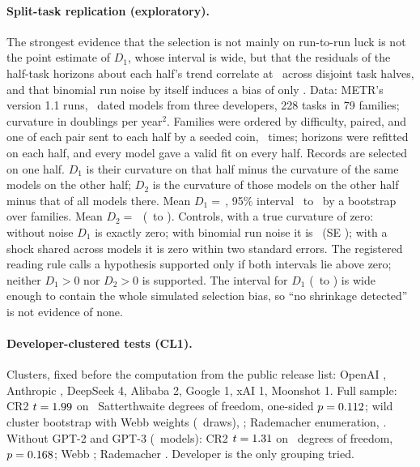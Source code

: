 \documentclass[aps,pre,twocolumn,superscriptaddress,nofootinbib,9pt]{revtex4-2}
\begin{document}
\paragraph*{Split-task replication (exploratory).} The strongest evidence that the selection is not mainly on run-to-run luck is not the point estimate of $D_1$, whose interval is wide, but that the residuals of the half-task horizons about each half's trend correlate at \stR\ across disjoint task halves, and that binomial run noise by itself induces a bias of only \stCone. Data: METR's version 1.1 runs, \stModels\ dated models from three developers, 228 tasks in 79 families; curvature in doublings per year$^2$. Families were ordered by difficulty, paired, and one of each pair sent to each half by a seeded coin, \stSplits\ times; horizons were refitted on each half, and every model gave a valid fit on every half. Records are selected on one half. $D_1$ is their curvature on that half minus the curvature of the same models on the other half; $D_2$ is the curvature of those models on the other half minus that of all models there. Mean $D_1=\,$\stDone, 95\% interval \stDoneLo\ to \stDoneHi\ by a bootstrap over families. Mean $D_2=\,$\stDtwo\ (\stDtwoLo\ to \stDtwoHi). Controls, with a true curvature of zero: without noise $D_1$ is exactly zero; with binomial run noise it is \stCone\ (SE \stConeSe); with a shock shared across models it is zero within two standard errors. The registered reading rule calls a hypothesis supported only if both intervals lie above zero; neither $D_1>0$ nor $D_2>0$ is supported. The interval for $D_1$ (\stDoneLo\ to \stDoneHi) is wide enough to contain the whole simulated selection bias, so ``no shrinkage detected'' is not evidence of none. 

\paragraph*{Developer-clustered tests (CL1).} Clusters, fixed before the computation from the public release list: OpenAI \clMax, Anthropic \clSecond, DeepSeek 4, Alibaba 2, Google 1, xAI 1, Moonshot 1. Full sample: CR2 $t=1.99$ on \clDf\ Satterthwaite degrees of freedom, one-sided $p=0.112$; wild cluster bootstrap with Webb weights (\clWebbB\ draws), \clWebb; Rademacher enumeration, \clRad. Without GPT-2 and GPT-3 (\dropFirstTwoN\ models): CR2 $t=1.31$ on \clDfDrop\ degrees of freedom, $p=0.168$; Webb \clWebbDrop; Rademacher \clRadDrop. Developer is the only grouping tried.
\end{document}

